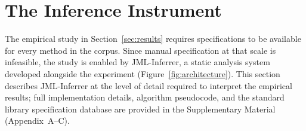 \section{The Inference Instrument}
\label{sec:approach}

The empirical study in Section~\ref{sec:results} requires specifications to be available for every method in the corpus. Since manual specification at that scale is infeasible, the study is enabled by JML-Inferrer, a static analysis system developed alongside the experiment (Figure~\ref{fig:architecture}). This section describes JML-Inferrer at the level of detail required to interpret the empirical results; full implementation details, algorithm pseudocode, and the standard library specification database are provided in the Supplementary Material (Appendix~A--C).

